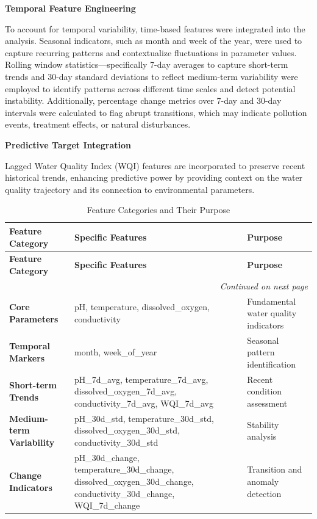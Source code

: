 \textbf{Temporal Feature Engineering}

 To account for temporal variability, time-based features were integrated into the analysis. Seasonal indicators, such as month and week of the year, were used to capture recurring patterns and contextualize fluctuations in parameter values. Rolling window statistics—specifically 7-day averages to capture short-term trends and 30-day standard deviations to reflect medium-term variability were employed to identify patterns across different time scales and detect potential instability. Additionally, percentage change metrics over 7-day and 30-day intervals were calculated to flag abrupt transitions, which may indicate pollution events, treatment effects, or natural disturbances.

\textbf{Predictive Target Integration}

Lagged Water Quality Index (WQI) features are incorporated to preserve recent historical trends, enhancing predictive power by providing context on the water quality trajectory and its connection to environmental parameters.

\begin{longtable}{|p{4cm}|p{7cm}|p{5cm}|}
\caption{Feature Categories and Their Purpose} \\
\hline
\textbf{Feature Category} & \textbf{Specific Features} & \textbf{Purpose} \\
\hline
\endfirsthead

\hline
\textbf{Feature Category} & \textbf{Specific Features} & \textbf{Purpose} \\
\hline
\endhead

\hline
\multicolumn{3}{r}{\small\itshape Continued on next page} \\
\hline
\endfoot

\hline
\endlastfoot

\textbf{Core Parameters} &
pH, temperature, dissolved\_oxygen, conductivity &
Fundamental water quality indicators \\
\hline

\textbf{Temporal Markers} &
month, week\_of\_year &
Seasonal pattern \newline identification \\
\hline

\textbf{Short-term Trends} &
pH\_7d\_avg, temperature\_7d\_avg, dissolved\_oxygen\_7d\_avg, conductivity\_7d\_avg, WQI\_7d\_avg &
Recent condition \newline assessment \\
\hline

\textbf{Medium-term Variability} &
pH\_30d\_std, temperature\_30d\_std, dissolved\_oxygen\_30d\_std, conductivity\_30d\_std &
Stability analysis \\
\hline

\textbf{Change Indicators} &
pH\_30d\_change, temperature\_30d\_change, dissolved\_oxygen\_30d\_change, conductivity\_30d\_change, WQI\_7d\_change &
Transition and anomaly detection \\
\hline
\end{longtable}

